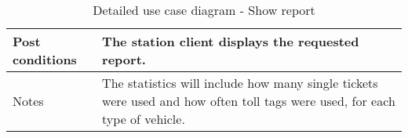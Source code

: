 \begin{table}[H]
\begin{tabular}{| p{3cm}| p{11.5cm}|}
        Post conditions         & The station client displays the requested report. \\\hline
        Notes                   & The statistics will include how many single tickets were used and how often toll tags were used, for each type of vehicle. \\\hline
        
    \end{tabular}
    \caption{Detailed use case diagram - Show report}
    \label{tab:UC4}
\end{table}
